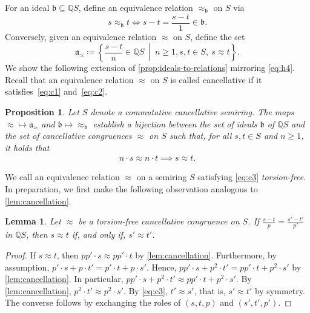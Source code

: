 \documentclass[11pt]{scrartcl}
\theoremstyle{definition}
\theoremstyle{plain}
\newtheorem{lemma}[definition]{Lemma}
\newtheorem{proposition}[definition]{Proposition}
\theoremstyle{remark}
\begin{document}
	For an ideal $\mathfrak{b} \subseteq \mathbb{Q}S$,
	define an equivalence relation $\approx_{\mathfrak{b}}$ on $S$ via
	\[
		s \approx_{\mathfrak{b}} t \iff s - t = \frac{s-t}{1} \in \mathfrak{b}.
	\]
	Conversely, given an equivalence relation $\approx$ on $S$,
	define the set
	\[
		\mathfrak{a}_{\approx} \coloneqq \left\{\frac{s - t}{n}\in \mathbb{Q}S \ \middle|\ n\geq 1,s, t \in S, \ s \approx t \right\}.
	\]
	We show the following extension of \cref{prop:ideals-to-relations} mirroring \eqref{eq:h4}.
    Recall that an equivalence relation $\approx$ on $S$ is called cancellative if it satisfies~\eqref{eq:c1} and~\eqref{eq:c2}.

	\begin{proposition}\label{prop:ideals-to-relations-rational}
		Let $S$ denote a commutative cancellative semiring.
		The maps ${\approx} \mapsto \mathfrak{a}_{\approx }$
		and  $\mathfrak{b} \mapsto {\approx_{\mathfrak{b}}}$
		establish a bijection between the set of ideals $\mathfrak{b}$ of $\mathbb{Q}S$
		and the set of cancellative congruences $\approx$ on $S$
		such that, for all $s,t\in S$ and $n \geq 1$, it holds that 
		\begin{align}\label{eq:c3}
			n\cdot s \approx n\cdot t \implies s \approx t.
		\end{align}
	\end{proposition}

	We call an equivalence relation $\approx$ on a semiring $S$ satisfying \eqref{eq:c3} \emph{torsion-free}.
	In preparation, we first make the following observation analogous to \cref{lem:cancellation}.

	\begin{lemma}\label{lem:cancellation-rationals}
		Let $\approx$ be a torsion-free cancellative congruence on $S$.
			If $\frac{s - t}{p} = \frac{s' - t'}{p'}$ in $\mathbb{Q}S$,
			then $s \approx t$ if, and only if, $s' \approx t'$.
	\end{lemma}
	\begin{proof}
		If $s \approx t$, then $pp' \cdot s \approx pp' \cdot t$ by \cref{lem:cancellation}.
			Furthermore, by assumption, $p' \cdot s + p \cdot t' = p' \cdot t + p \cdot s'$.
			Hence, $p p' \cdot s + p^2 \cdot t' = pp' \cdot t + p^2 \cdot s'$ by \cref{lem:cancellation}.
			In particular,
			 $p p' \cdot s + p^2 \cdot t' \approx pp' \cdot t + p^2 \cdot s'$.
			By \cref{lem:cancellation},
			$p^2 \cdot t' \approx p^2 \cdot s'$.
			By \eqref{eq:c3}, $t' \approx s'$, that is, $s' \approx t'$ by symmetry.
			The converse follows by exchanging the roles of $(s,t,p)$ and $(s',t',p')$.
	\end{proof}
\end{document}
